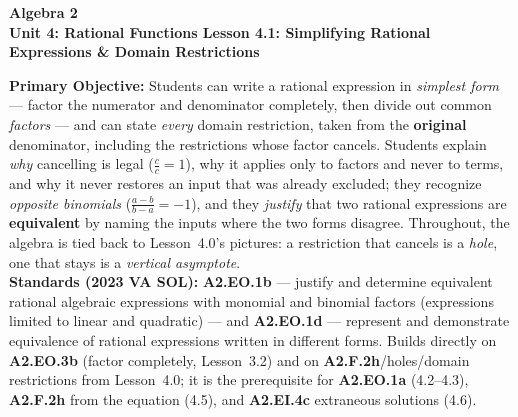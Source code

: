 \documentclass[10pt]{article}
\newcommand{\CourseName}{Algebra 2}
\newcommand{\UnitNumberName}{Unit 4: Rational Functions \quad}
\newcommand{\LessonNumberName}{Lesson 4.1: Simplifying Rational Expressions \& Domain Restrictions}
\begin{document}
\begin{center}
    {\Large\bfseries \CourseName \\
    {\small\bfseries \UnitNumberName \LessonNumberName}}
\end{center}

\begin{tcolorbox}[colback=forestbg, colframe=forest, boxrule=0.9pt, arc=2mm,
    left=2mm, right=2mm, top=1.5mm, bottom=1.5mm]
    \textbf{Primary Objective:} Students can write a rational expression in \emph{simplest form} ---
    factor the numerator and denominator completely, then divide out common \emph{factors} --- and can
    state \emph{every} domain restriction, taken from the \textbf{original} denominator, including the
    restrictions whose factor cancels. Students explain \emph{why} cancelling is legal
    ($\frac{c}{c}=1$), why it applies only to factors and never to terms, and why it never restores an
    input that was already excluded; they recognize \emph{opposite binomials} ($\frac{a-b}{b-a}=-1$),
    and they \emph{justify} that two rational expressions are \textbf{equivalent} by naming the inputs
    where the two forms disagree. Throughout, the algebra is tied back to Lesson~4.0's pictures: a
    restriction that cancels is a \emph{hole}, one that stays is a \emph{vertical asymptote}.
    \\[2pt]
    \textbf{Standards (2023 VA SOL):} \textbf{A2.EO.1b} --- justify and determine equivalent rational
    algebraic expressions with monomial and binomial factors (expressions limited to linear and
    quadratic) --- and \textbf{A2.EO.1d} --- represent and demonstrate equivalence of rational
    expressions written in different forms. Builds directly on \textbf{A2.EO.3b} (factor completely,
    Lesson~3.2) and on \textbf{A2.F.2h}/holes/domain restrictions from Lesson~4.0; it is the
    prerequisite for \textbf{A2.EO.1a} (4.2--4.3), \textbf{A2.F.2h} from the equation (4.5), and
    \textbf{A2.EI.4c} extraneous solutions (4.6).
\end{tcolorbox}
\end{document}
